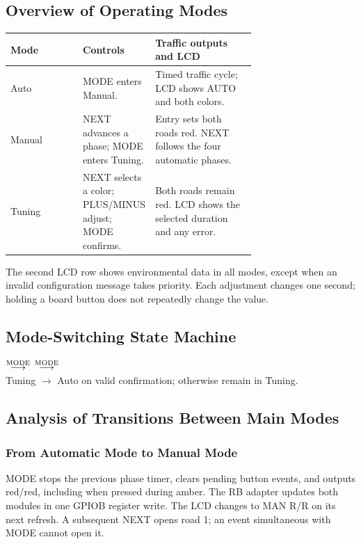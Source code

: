 \subsection{Overview of Operating Modes}
\begin{center}
\begin{tabular}{l|p{0.29\linewidth}|p{0.41\linewidth}}
Mode & Controls & Traffic outputs and LCD\\ \hline
Auto & MODE enters Manual. & Timed traffic cycle; LCD shows AUTO and both colors.\\
Manual & NEXT advances a phase; MODE enters Tuning. & Entry sets both roads red. NEXT follows the four automatic phases.\\
Tuning & NEXT selects a color; PLUS/MINUS adjust; MODE confirms. & Both roads remain red. LCD shows the selected duration and any error.\\
\end{tabular}
\end{center}
The second LCD row shows environmental data in all modes, except when an invalid configuration message takes priority. Each adjustment changes one second; holding a board button does not repeatedly change the value.

\subsection{Mode-Switching State Machine}
\begin{center}
 $\stackrel{\rm MODE}{\longrightarrow}$
 $\stackrel{\rm MODE}{\longrightarrow}$
\\[3pt]
Tuning $\longrightarrow$ Auto on valid confirmation; otherwise remain in Tuning.
\end{center}

\subsection{Analysis of Transitions Between Main Modes}
\subsubsection{From Automatic Mode to Manual Mode}
MODE stops the previous phase timer, clears pending button events, and outputs red/red, including when pressed during amber. The RB adapter updates both modules in one GPIOB register write. The LCD changes to MAN R/R on its next refresh. A subsequent NEXT opens road 1; an event simultaneous with MODE cannot open it.

